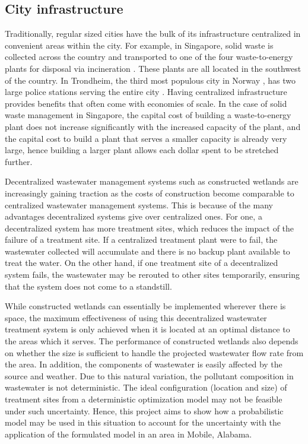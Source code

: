 \documentclass[preprint,12pt,authoryear]{elsarticle}
\begin{document}
\subsection{City infrastructure}
Traditionally, regular sized cities have the bulk of its infrastructure centralized in convenient areas within the city. For example, in Singapore, solid waste is collected across the country and transported to one of the four waste-to-energy plants for disposal via incineration \citep{nea2016}. These plants are all located in the southwest of the country.  In Trondheim, the third most populous city in Norway \citep{statistisk2013}, has two large police stations serving the entire city \citep{politinorway}. Having centralized infrastructure provides benefits that often come with economies of scale. In the case of solid waste management in Singapore, the capital cost of building a waste-to-energy plant does not increase significantly with the increased capacity of the plant, and the capital cost to build a plant that serves a smaller capacity is already very large, hence building a larger plant allows each dollar spent to be stretched further.




%
Decentralized wastewater management systems such as constructed wetlands are increasingly gaining traction as the costs of construction become comparable to centralized wastewater management systems. This is because of the many advantages decentralized systems give over centralized ones. For one, a decentralized system has more treatment sites, which reduces the impact of the failure of a treatment site. If a centralized treatment plant were to fail, the wastewater collected will accumulate and there is no backup plant available to treat the water. On the other hand, if one treatment site of a decentralized system fails, the wastewater may be rerouted to other sites temporarily, ensuring that the system does not come to a standstill. 

While constructed wetlands can essentially be implemented wherever there is space, the maximum effectiveness of using this decentralized wastewater treatment system is only achieved when it is located at an optimal distance to the areas which it serves. The performance of constructed wetlands also depends on whether the size is sufficient to handle the projected wastewater flow rate from the area. In addition, the components of wastewater is easily affected by the source and weather. Due to this natural variation, the pollutant composition in wastewater is not deterministic. The ideal configuration (location and size) of treatment sites from a deterministic optimization model may not be feasible under such uncertainty. Hence, this project aims to show how a probabilistic model may be used in this situation to account for the uncertainty with the application of the formulated model in an area in Mobile, Alabama. 
\end{document}
